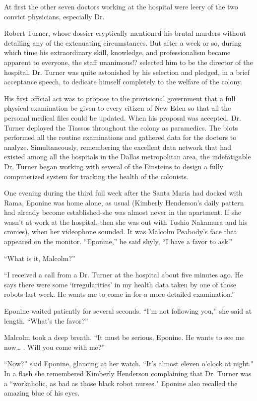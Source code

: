\documentclass[]{article}
\begin{document}
{At first the other seven doctors working at the hospital were leery of the two convict physicians, especially Dr.

Robert Turner, whose dossier cryptically mentioned his brutal murders without detailing any of the extenuating circumstances.  But after a week or so, during which time his extraordinary skill, knowledge, and professionalism became apparent to everyone, the staff unanimous!? selected him to be the director of the hospital.  Dr.  Turner was quite astonished by his selection and pledged, in a brief acceptance speech, to dedicate himself completely to the welfare of the colony.

His first official act was to propose to the provisional government that a full physical examination be given to every citizen of New Eden so that all the personal medical files could be updated.  When his proposal was accepted, Dr.  Turner deployed the Tiassos throughout the colony as paramedics.  The biots performed all the routine examinations and gathered data for the doctors to analyze.  Simultaneously, remembering the excellent data network that had existed among all the hospitals in the Dallas metropolitan area, the indefatigable Dr.  Turner began working with several of the Einsteins to design a fully computerized system for tracking the health of the colonists.

One evening during the third full week after the Santa Maria had docked with Rama, Eponine was home alone, as usual (Kimberly Henderson’s daily pattern had already become established-she was almost never in the apartment.  If she wasn’t at work at the hospital, then she was out with Toshio Nakamura and his cronies), when her videophone sounded.  It was Malcolm Peabody’s face that appeared on the monitor.  “Eponine,” he said shyly, “I have a favor to ask.”

“What is it, Malcolm?”

“I received a call from a Dr.  Turner at the hospital about five minutes ago.  He says there were some ‘irregularities’ in my health data taken by one of those robots last week.  He wants me to come in for a more detailed examination.”

Eponine waited patiently for several seconds.  “I’m not following you,” she said at length.  “What’s the favor?”

Malcolm took a deep breath.  “It must be serious, Eponine.  He wants to see me now… .  Will you come with me?”

“Now?” said Eponine, glancing at her watch.  “It’s almost eleven o’clock at night."  In a flash she remembered Kimberly Henderson complaining that Dr.  Turner was a “workaholic, as bad as those black robot nurses."  Eponine also recalled the amazing blue of his eyes.

}
\end{document}
